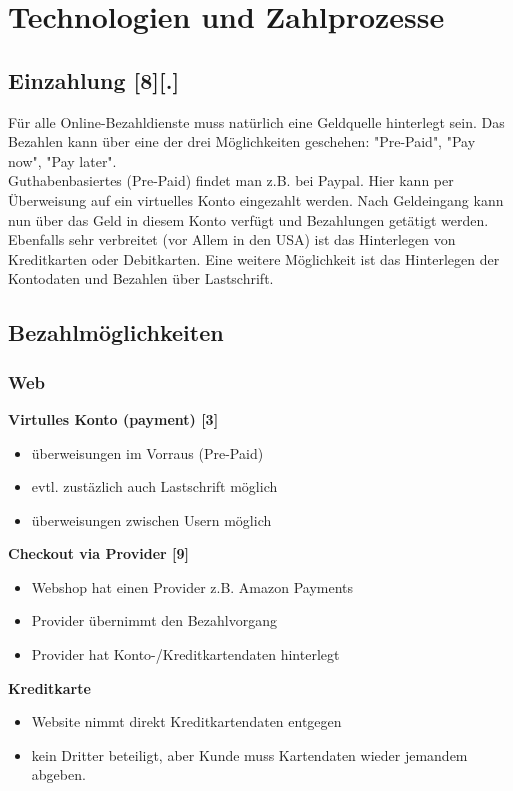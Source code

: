\section{Technologien und Zahlprozesse}

\subsection{Einzahlung [8][.]}
Für alle Online-Bezahldienste muss natürlich eine Geldquelle hinterlegt sein. Das Bezahlen kann über eine der drei Möglichkeiten geschehen: "Pre-Paid", "Pay now", "Pay later".\\
Guthabenbasiertes (Pre-Paid) findet man z.B. bei Paypal. Hier kann per Überweisung auf ein virtuelles Konto eingezahlt werden. Nach Geldeingang kann nun über das Geld in diesem Konto verfügt und Bezahlungen getätigt werden.
Ebenfalls sehr verbreitet (vor Allem in den USA) ist das Hinterlegen von Kreditkarten oder Debitkarten. Eine weitere Möglichkeit ist das Hinterlegen der Kontodaten und Bezahlen über Lastschrift.

\subsection{Bezahlmöglichkeiten}
\subsubsection{Web}
\textbf{Virtulles Konto (payment) [3]}\\


        \begin{itemize}
        \item überweisungen im Vorraus (Pre-Paid)
        \item evtl. zustäzlich auch Lastschrift möglich
        \item überweisungen zwischen Usern möglich
        \end{itemize}

\textbf{ Checkout via Provider [9]}\\
        \begin{itemize}
        \item Webshop hat einen Provider z.B. Amazon Payments
        \item Provider übernimmt den Bezahlvorgang
        \item Provider hat Konto-/Kreditkartendaten hinterlegt
        \end{itemize}

\textbf{ Kreditkarte}\\
        \begin{itemize}
        \item Website nimmt direkt Kreditkartendaten entgegen
        \item kein Dritter beteiligt, aber Kunde muss Kartendaten wieder jemandem abgeben.
        \end{itemize}

